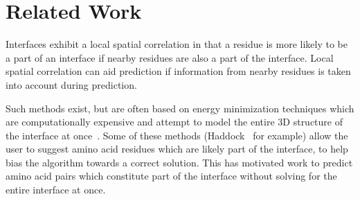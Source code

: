 

\chapter{Related Work}
\label{chap:relatedwork} 

Interfaces exhibit a local spatial correlation in that a residue is more likely to be a part of an interface if nearby residues are also a part of the interface. 
Local spatial correlation can aid prediction if information from nearby residues is taken into account during prediction.


Such methods exist, but are often based on energy minimization techniques which are computationally expensive and attempt to model the entire 3D structure of the interface at once~\cite{esmaielbeiki2015}.
Some of these methods (Haddock~\cite{zundert2016} for example) allow the user to suggest amino acid residues which are likely part of the interface, to help bias the algorithm towards a correct solution.
This has motivated work to predict amino acid pairs which constitute part of the interface without solving for the entire interface at once. 




